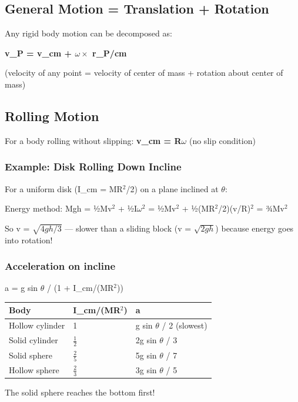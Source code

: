 \documentclass[12pt,a4paper,openany]{book}
\begin{document}
{{\subsection{General Motion = Translation + Rotation}

Any rigid body motion can be decomposed as:

\textbf{v_P = v_cm + $\omega\times$ r_{P/cm}}

(velocity of any point = velocity of center of mass + rotation about center of mass)

\subsection{Rolling Motion }

For a body rolling without slipping: \textbf{v_cm = R$\omega$} (no slip condition)

\subsubsection{Example: Disk Rolling Down Incline}
For a uniform disk (I_cm = MR$^2$/2) on a plane inclined at $\theta$:

Energy method: Mgh = ½Mv$^2$ + ½I$\omega^2$ = ½Mv$^2$ + ½(MR$^2$/2)(v/R)$^2$ = ¾Mv$^2$

So v = $\sqrt{4gh/3}$ — slower than a sliding block (v = $\sqrt{2gh}$) because energy goes into rotation!

\subsubsection{Acceleration on incline}
a = g sin $\theta$ / (1 + I_cm/(MR$^2$))

\begin{center}
\begin{tabular}{|l|l|l|}
\hline
\textbf{Body} & \textbf{I_cm/(MR$^2$)} & \textbf{a} \\
\hline
Hollow cylinder & 1 & g sin $\theta$ / 2 (slowest) \\
\hline
Solid cylinder & $\frac{1}{2}$ & 2g sin $\theta$ / 3 \\
\hline
Solid sphere & $\frac{2}{5}$ & 5g sin $\theta$ / 7 \\
\hline
Hollow sphere & $\frac{2}{3}$ & 3g sin $\theta$ / 5 \\
\hline
\end{tabular}
\end{center}

The solid sphere reaches the bottom first!

}}
\end{document}
